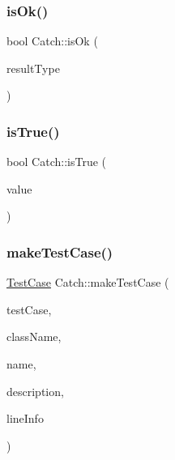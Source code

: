 \hypertarget{namespace_catch_a5205869c81c06d3460759cb86676ae68}{}\label{namespace_catch_a5205869c81c06d3460759cb86676ae68} 
\subsubsection{\texorpdfstring{is\+Ok()}{isOk()}}
{\footnotesize\ttfamily bool Catch\+::is\+Ok (\begin{DoxyParamCaption}\item[{\hyperlink{struct_catch_1_1_result_was_a624e1ee3661fcf6094ceef1f654601ef}{Result\+Was\+::\+Of\+Type}}]{result\+Type }\end{DoxyParamCaption})\hspace{0.3cm}{\ttfamily [inline]}}

\hypertarget{namespace_catch_ae3bc6c6677e64e6eaa720dc3add31852}{}\label{namespace_catch_ae3bc6c6677e64e6eaa720dc3add31852} 
\subsubsection{\texorpdfstring{is\+True()}{isTrue()}}
{\footnotesize\ttfamily bool Catch\+::is\+True (\begin{DoxyParamCaption}\item[{bool}]{value }\end{DoxyParamCaption})\hspace{0.3cm}{\ttfamily [inline]}}

\hypertarget{namespace_catch_a2a784590bb5068810d3f6013fed1f1d3}{}\label{namespace_catch_a2a784590bb5068810d3f6013fed1f1d3} 
\subsubsection{\texorpdfstring{make\+Test\+Case()}{makeTestCase()}}
{\footnotesize\ttfamily \hyperlink{class_catch_1_1_test_case}{Test\+Case} Catch\+::make\+Test\+Case (\begin{DoxyParamCaption}\item[{\hyperlink{struct_catch_1_1_i_test_case}{I\+Test\+Case} $\ast$}]{test\+Case,  }\item[{std\+::string const \&}]{class\+Name,  }\item[{std\+::string const \&}]{name,  }\item[{std\+::string const \&}]{description,  }\item[{\hyperlink{struct_catch_1_1_source_line_info}{Source\+Line\+Info} const \&}]{line\+Info }\end{DoxyParamCaption})}

